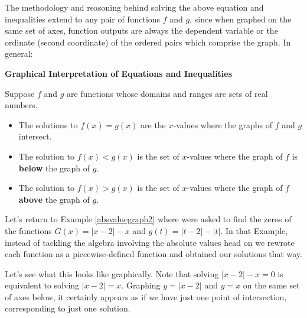\documentclass{ximera}
\begin{document}
\medskip

The methodology and reasoning behind solving the above equation and inequalities extend to any pair of functions $f$ and $g$, since when graphed on the same set of axes, function outputs are always the dependent variable or the ordinate (second coordinate) of the ordered pairs which comprise the graph.  In general:

\medskip


\centerline{\textbf{Graphical Interpretation of Equations and Inequalities}}

\medskip

Suppose $f$ and $g$ are functions whose domains and ranges are sets of real numbers.

\begin{itemize}

\item  The solutions to $f(x)=g(x)$ are the $x$-values where the graphs of $f$ and $g$ intersect.

\item  The solution to $f(x) < g(x)$ is the set of $x$-values where the graph of $f$ is \textbf{below} the graph of $g$.

\item  The solution to $f(x) > g(x)$ is the set of $x$-values where the graph of $f$ \textbf{above} the graph of $g$.

\end{itemize}


\medskip

Let's return to  Example \ref{absvaluegraph2} where were asked to find the zeros of the functions $G(x) = |x-2| -x$ and $g(t) = |t-2|-|t|$. In that Example, instead of tackling the algebra involving the absolute values head on we rewrote each function as a piecewise-defined function and obtained our solutions that way.  

\medskip

Let's see what this looks like graphically.  Note that solving $|x-2|-x=0$ is equivalent to solving $|x-2|=x$. Graphing  $y = |x-2|$ and $y=x$ on the same set of axes below, it certainly appears as if we have just one point of intersection, corresponding to just one solution. 

\begin{center}
\end{center}
\end{document}
